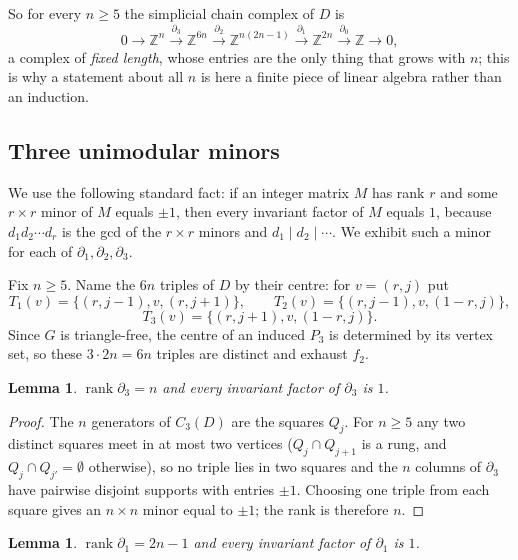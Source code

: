 \documentclass[11pt]{amsart}
\newtheorem{lemma}[theorem]{Lemma}
\theoremstyle{definition}
\DeclareMathOperator{\rank}{rank}
\newcommand{\Zm}{\mathbb{Z}}
\begin{document}
So for every $n\ge5$ the simplicial chain complex of $D$ is
\begin{equation}\label{eq:chain}
 0\longrightarrow \Zm^{n}\xrightarrow{\ \partial_3\ }\Zm^{6n}
 \xrightarrow{\ \partial_2\ }\Zm^{n(2n-1)}\xrightarrow{\ \partial_1\ }\Zm^{2n}
 \xrightarrow{\ \partial_0\ }\Zm\longrightarrow 0,
\end{equation}
a complex of \emph{fixed length}, whose entries are the only thing that grows with $n$; this is why a
statement about all $n$ is here a finite piece of linear algebra rather than an induction.

\subsection{Three unimodular minors}

We use the following standard fact: if an integer matrix $M$ has rank $r$ and some $r\times r$ minor
of $M$ equals $\pm1$, then every invariant factor of $M$ equals $1$, because $d_1d_2\cdots d_r$ is
the gcd of the $r\times r$ minors and $d_1\mid d_2\mid\cdots$. We exhibit such a minor for each of
$\partial_1,\partial_2,\partial_3$.

Fix $n\ge5$. Name the $6n$ triples of $D$ by their centre: for $v=(r,j)$ put
\[
 T_1(v)=\{(r,j{-}1),v,(r,j{+}1)\},\qquad
 T_2(v)=\{(r,j{-}1),v,(1{-}r,j)\},
\]
\[
 T_3(v)=\{(r,j{+}1),v,(1{-}r,j)\}.
\]
Since $G$ is triangle-free, the centre of an induced $P_3$ is determined by its vertex set, so these
$3\cdot 2n=6n$ triples are distinct and exhaust $f_2$.

\begin{lemma}\label{lem:d3}
$\rank\partial_3=n$ and every invariant factor of $\partial_3$ is $1$.
\end{lemma}

\begin{proof}
The $n$ generators of $C_3(D)$ are the squares $Q_j$. For $n\ge5$ any two distinct squares meet in at
most two vertices ($Q_j\cap Q_{j+1}$ is a rung, and $Q_j\cap Q_{j'}=\emptyset$ otherwise), so no
triple lies in two squares and the $n$ columns of $\partial_3$ have pairwise disjoint supports with
entries $\pm1$. Choosing one triple from each square gives an $n\times n$ minor equal to $\pm1$;
the rank is therefore $n$.
\end{proof}

\begin{lemma}\label{lem:d1}
$\rank\partial_1=2n-1$ and every invariant factor of $\partial_1$ is $1$.
\end{lemma}
\end{document}
